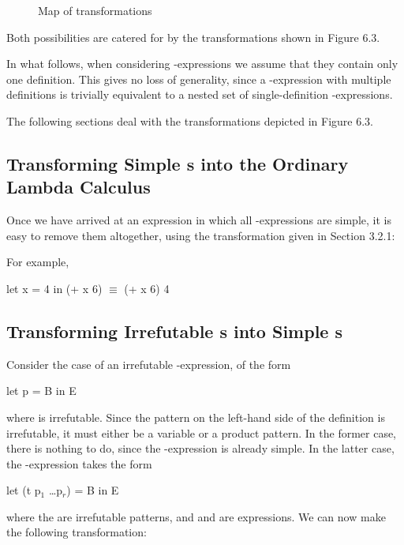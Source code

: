 {\begin{figure}[H]
{	}%

	\caption{\textsf Map of  transformations}
\end{figure}

\noindent Both possibilities are catered for by the transformations shown in Figure 6.3.

In what follows, when considering -expressions we assume that they
contain only one definition. This gives no loss of generality, since a -expression with multiple definitions is trivially equivalent to a nested set of
single-definition -expressions.

The following sections deal with the transformations depicted in Figure 6.3.

\subsection{Transforming Simple s into the Ordinary Lambda Calculus}

Once we have arrived at an expression in which all -expressions are simple,
it is easy to remove them altogether, using the transformation given in Section
3.2.1:

\noindent For example,
\begin{mlcoded}
	let x = 4 in (+ x 6) $\equiv$ (+ x 6) 4
\end{mlcoded}

\subsection{Transforming Irrefutable s into Simple s}

Consider the case of an irrefutable -expression, of the form
\begin{mlcoded}
	let p = B in E
\end{mlcoded}
where  is irrefutable. Since the pattern on the left-hand side of the definition
is irrefutable, it must either be a variable or a product pattern. In the former
case, there is nothing to do, since the -expression is already simple. In the
latter case, the -expression takes the form
\begin{mlcoded}
	let (t p$_1$ \ldots p$_r$) = B in E
\end{mlcoded}
where the  are irrefutable patterns, and  and  are expressions. We can now
make the following transformation:

}
